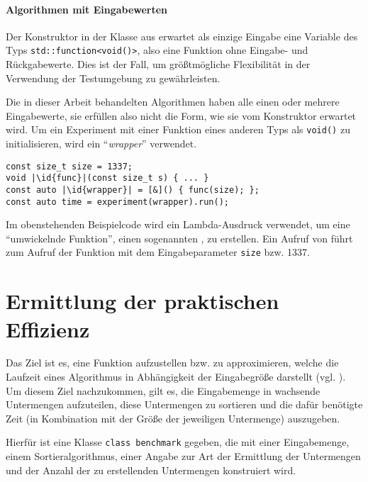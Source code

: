 \paragraph{Algorithmen mit Eingabewerten} Der Konstruktor in der Klasse aus  erwartet als einzige Eingabe eine Variable des Typs \lstinline{std::function<void()>}, also eine Funktion ohne Eingabe- und Rückgabewerte. Dies ist der Fall, um größtmögliche Flexibilität in der Verwendung der Testumgebung zu gewährleisten.

Die in dieser Arbeit behandelten Algorithmen haben alle einen oder mehrere Eingabewerte, sie erfüllen also nicht die Form, wie sie vom Konstruktor erwartet wird. Um ein Experiment mit einer Funktion eines anderen Typs als \lstinline{void()} zu initialisieren, wird ein \enquote{\emph{wrapper}} verwendet.

\begin{minipage}{\linewidth}
\begin{lstlisting}[numbers=none]
const size_t size = 1337;
void |\id{func}|(const size_t s) { ... }
const auto |\id{wrapper}| = [&]() { func(size); };
const auto time = experiment(wrapper).run();
\end{lstlisting}
\end{minipage}

Im obenstehenden Beispielcode wird ein Lambda-Ausdruck verwendet, um eine \enquote{umwickelnde Funktion}, einen sogenannten , zu erstellen. Ein Aufruf von  führt zum Aufruf der Funktion  mit dem Eingabeparameter \lstinline{size} bzw. 1337.

\section{Ermittlung der praktischen Effizienz}
\label{sec:funkterm}

Das Ziel ist es, eine Funktion aufzustellen bzw. zu approximieren, welche die Laufzeit eines Algorithmus in Abhängigkeit der Eingabegröße darstellt (vgl. \cite[37]{mcg2012}). Um diesem Ziel nachzukommen, gilt es, die Eingabemenge in wachsende Untermengen aufzuteilen, diese Untermengen zu sortieren und die dafür benötigte Zeit (in Kombination mit der Größe der jeweiligen Untermenge) auszugeben.

Hierfür ist eine Klasse \lstinline{class benchmark} gegeben, die mit einer Eingabemenge, einem Sortieralgorithmus, einer Angabe zur Art der Ermittlung der Untermengen und der Anzahl der zu erstellenden Untermengen konstruiert wird.

